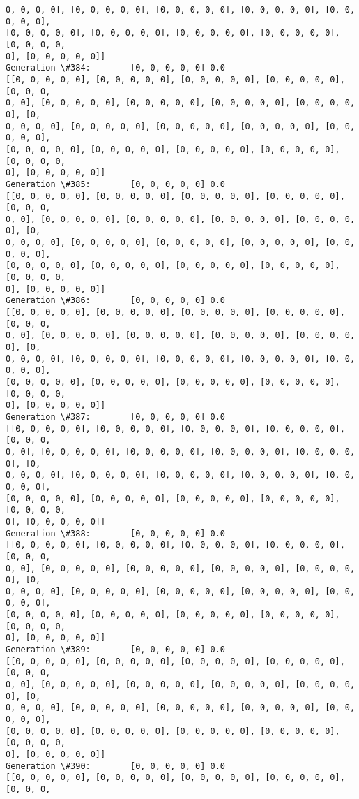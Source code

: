 \documentclass[11pt]{article}
\begin{document}
\begin{Verbatim}[commandchars=\\\{\}]
0, 0, 0, 0], [0, 0, 0, 0, 0], [0, 0, 0, 0, 0], [0, 0, 0, 0, 0], [0, 0, 0, 0, 0],
[0, 0, 0, 0, 0], [0, 0, 0, 0, 0], [0, 0, 0, 0, 0], [0, 0, 0, 0, 0], [0, 0, 0, 0,
0], [0, 0, 0, 0, 0]]
Generation \#384:        [0, 0, 0, 0, 0] 0.0
[[0, 0, 0, 0, 0], [0, 0, 0, 0, 0], [0, 0, 0, 0, 0], [0, 0, 0, 0, 0], [0, 0, 0,
0, 0], [0, 0, 0, 0, 0], [0, 0, 0, 0, 0], [0, 0, 0, 0, 0], [0, 0, 0, 0, 0], [0,
0, 0, 0, 0], [0, 0, 0, 0, 0], [0, 0, 0, 0, 0], [0, 0, 0, 0, 0], [0, 0, 0, 0, 0],
[0, 0, 0, 0, 0], [0, 0, 0, 0, 0], [0, 0, 0, 0, 0], [0, 0, 0, 0, 0], [0, 0, 0, 0,
0], [0, 0, 0, 0, 0]]
Generation \#385:        [0, 0, 0, 0, 0] 0.0
[[0, 0, 0, 0, 0], [0, 0, 0, 0, 0], [0, 0, 0, 0, 0], [0, 0, 0, 0, 0], [0, 0, 0,
0, 0], [0, 0, 0, 0, 0], [0, 0, 0, 0, 0], [0, 0, 0, 0, 0], [0, 0, 0, 0, 0], [0,
0, 0, 0, 0], [0, 0, 0, 0, 0], [0, 0, 0, 0, 0], [0, 0, 0, 0, 0], [0, 0, 0, 0, 0],
[0, 0, 0, 0, 0], [0, 0, 0, 0, 0], [0, 0, 0, 0, 0], [0, 0, 0, 0, 0], [0, 0, 0, 0,
0], [0, 0, 0, 0, 0]]
Generation \#386:        [0, 0, 0, 0, 0] 0.0
[[0, 0, 0, 0, 0], [0, 0, 0, 0, 0], [0, 0, 0, 0, 0], [0, 0, 0, 0, 0], [0, 0, 0,
0, 0], [0, 0, 0, 0, 0], [0, 0, 0, 0, 0], [0, 0, 0, 0, 0], [0, 0, 0, 0, 0], [0,
0, 0, 0, 0], [0, 0, 0, 0, 0], [0, 0, 0, 0, 0], [0, 0, 0, 0, 0], [0, 0, 0, 0, 0],
[0, 0, 0, 0, 0], [0, 0, 0, 0, 0], [0, 0, 0, 0, 0], [0, 0, 0, 0, 0], [0, 0, 0, 0,
0], [0, 0, 0, 0, 0]]
Generation \#387:        [0, 0, 0, 0, 0] 0.0
[[0, 0, 0, 0, 0], [0, 0, 0, 0, 0], [0, 0, 0, 0, 0], [0, 0, 0, 0, 0], [0, 0, 0,
0, 0], [0, 0, 0, 0, 0], [0, 0, 0, 0, 0], [0, 0, 0, 0, 0], [0, 0, 0, 0, 0], [0,
0, 0, 0, 0], [0, 0, 0, 0, 0], [0, 0, 0, 0, 0], [0, 0, 0, 0, 0], [0, 0, 0, 0, 0],
[0, 0, 0, 0, 0], [0, 0, 0, 0, 0], [0, 0, 0, 0, 0], [0, 0, 0, 0, 0], [0, 0, 0, 0,
0], [0, 0, 0, 0, 0]]
Generation \#388:        [0, 0, 0, 0, 0] 0.0
[[0, 0, 0, 0, 0], [0, 0, 0, 0, 0], [0, 0, 0, 0, 0], [0, 0, 0, 0, 0], [0, 0, 0,
0, 0], [0, 0, 0, 0, 0], [0, 0, 0, 0, 0], [0, 0, 0, 0, 0], [0, 0, 0, 0, 0], [0,
0, 0, 0, 0], [0, 0, 0, 0, 0], [0, 0, 0, 0, 0], [0, 0, 0, 0, 0], [0, 0, 0, 0, 0],
[0, 0, 0, 0, 0], [0, 0, 0, 0, 0], [0, 0, 0, 0, 0], [0, 0, 0, 0, 0], [0, 0, 0, 0,
0], [0, 0, 0, 0, 0]]
Generation \#389:        [0, 0, 0, 0, 0] 0.0
[[0, 0, 0, 0, 0], [0, 0, 0, 0, 0], [0, 0, 0, 0, 0], [0, 0, 0, 0, 0], [0, 0, 0,
0, 0], [0, 0, 0, 0, 0], [0, 0, 0, 0, 0], [0, 0, 0, 0, 0], [0, 0, 0, 0, 0], [0,
0, 0, 0, 0], [0, 0, 0, 0, 0], [0, 0, 0, 0, 0], [0, 0, 0, 0, 0], [0, 0, 0, 0, 0],
[0, 0, 0, 0, 0], [0, 0, 0, 0, 0], [0, 0, 0, 0, 0], [0, 0, 0, 0, 0], [0, 0, 0, 0,
0], [0, 0, 0, 0, 0]]
Generation \#390:        [0, 0, 0, 0, 0] 0.0
[[0, 0, 0, 0, 0], [0, 0, 0, 0, 0], [0, 0, 0, 0, 0], [0, 0, 0, 0, 0], [0, 0, 0,

\end{Verbatim}
\end{document}
